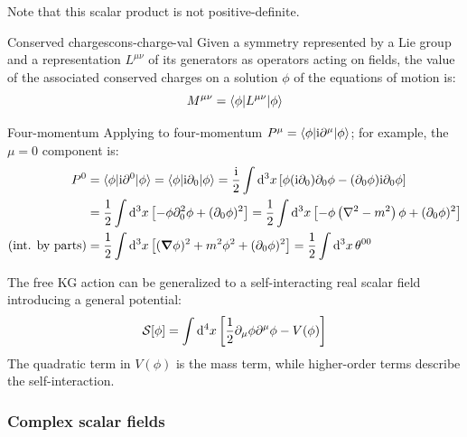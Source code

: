 Note that this scalar product is not positive-definite.

\begin{theorem}{Conserved charges}{cons-charge-val}
  Given a symmetry represented by a Lie group and a representation $ L^{\mu \nu} $ of its generators as operators acting on fields, the value of the associated conserved charges on a solution $ \phi $ of the equations of motion is:
  \begin{equation}
    M^{\mu \nu} = \braket{\phi | L^{\mu \nu} | \phi}
  \end{equation}
\end{theorem}

\begin{example}{Four-momentum}{}
  Applying  to four-momentum $ P^\mu = \braket{\phi | \mathrm{i} \partial^\mu | \phi} $; for example, the $ \mu = 0 $ component is:
  \begin{equation*}
    \begin{split}
      P^0 &= \braket{\phi | \mathrm{i} \partial^0 | \phi} = \braket{\phi | \mathrm{i} \partial_0 | \phi} = \frac{\mathrm{i}}{2} \int \mathrm{d}^3 x \left[ \phi (\mathrm{i} \partial_0) \partial_0 \phi - (\partial_0 \phi) \mathrm{i} \partial_0 \phi \right] \\
          &= \frac{1}{2} \int \mathrm{d}^3 x \left[ - \phi \partial_0^2 \phi + (\partial_0 \phi)^2 \right] = \frac{1}{2} \int \mathrm{d}^3 x \left[ - \phi \left( \nabla^2 - m^2 \right) \phi + (\partial_0 \phi)^2 \right] \\
      (\text{int. by parts}) &= \frac{1}{2} \int \mathrm{d}^3 x \left[ (\boldsymbol{\nabla} \phi)^2 + m^2 \phi^2 + (\partial_0 \phi)^2 \right] = \frac{1}{2} \int \mathrm{d}^3 x\, \theta^{00}
    \end{split}
  \end{equation*}
\end{example}

The free KG action can be generalized to a self-interacting real scalar field introducing a general potential:
\begin{equation}
  \mathcal{S}[\phi] = \int \mathrm{d}^4 x \left[ \frac{1}{2} \partial_\mu \phi \partial^\mu \phi - V(\phi) \right]
\end{equation}
The quadratic term in $ V(\phi) $ is the mass term, while higher-order terms describe the self-interaction.

\subsubsection{Complex scalar fields}

